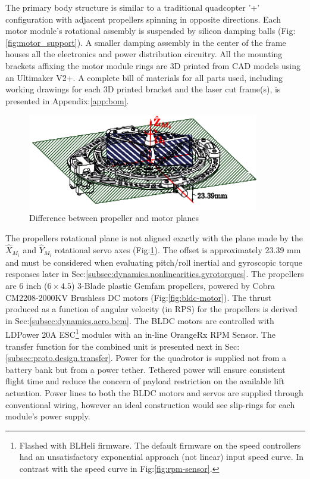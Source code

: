 \par
The primary body structure is similar to a traditional quadcopter '+' configuration with adjacent propellers spinning in opposite directions. Each motor module's rotational assembly is suspended by silicon damping balls (Fig:\ref{fig:motor_support}). A smaller damping assembly in the center of the frame houses all the electronics and power distribution circuitry. All the mounting brackets affixing the motor module rings are 3D printed from CAD models using an Ultimaker V2+\cite{ultimaker}. A complete bill of materials for all parts used, including working drawings for each 3D printed bracket and the laser cut frame(s), is presented in Appendix:\ref{app:bom}.
\par
\begin{figure}[hbtp]
\centering
\includegraphics[width=0.9\textwidth]{figs/motor-prop}
\caption{Difference between propeller and motor planes}
\label{fig:motor_prop}
\vspace{-10pt}
\end{figure}
The propellers rotational plane is not aligned exactly with the plane made by the $\hat{X}_{M_i}$ and $\hat{Y}_{M_i}$ rotational servo axes (Fig:\ref{fig:motor_prop}). The offset is approximately 23.39 mm and must be considered when evaluating pitch/roll inertial and gyroscopic torque responses later in Sec:\ref{subsec:dynamics.nonlinearities.gyrotorques}. The propellers are 6 inch ($6 \times 4.5$) 3-Blade plastic Gemfam propellers, powered by Cobra CM2208-2000KV Brushless DC motors (Fig:\ref{fig:bldc-motor}). The thrust produced as a function of angular velocity (in RPS) for the propellers is derived in Sec:\ref{subsec:dynamics.aero.bem}. 
\newpage
The BLDC motors are controlled with LDPower 20A ESC\footnote{Flashed with BLHeli\cite{BLHeli} firmware. The default firmware on the speed controllers had an unsatisfactory exponential approach (not linear) input speed curve. In contrast with the speed curve in Fig:\ref{fig:rpm-sensor}.} modules with an in-line OrangeRx RPM Sensor. The transfer function for the combined unit is presented next in Sec:\ref{subsec:proto.design.transfer}. Power for the quadrotor is supplied not from a battery bank but from a power tether. Tethered power will ensure consistent flight time and reduce the concern of payload restriction on the available lift actuation. Power lines to both the BLDC motors and servos are supplied through conventional wiring, however an ideal construction would see slip-rings for each module's power supply. 
